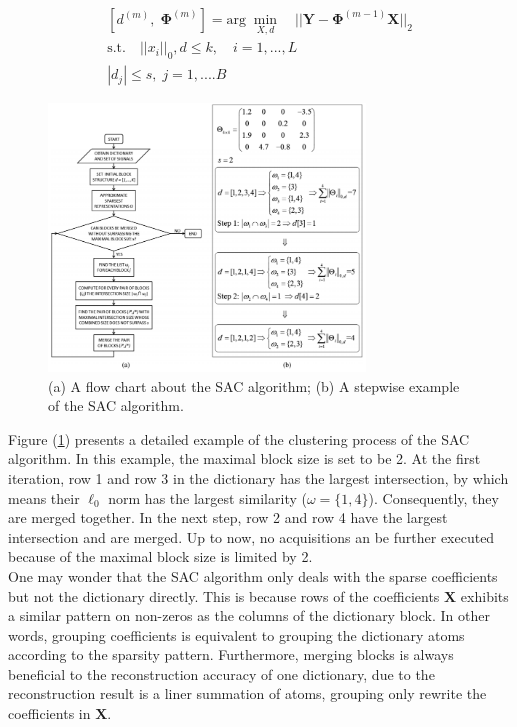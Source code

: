 \begin{equation}
\begin{aligned}
    \left[d^{(m)}, \;\mathbf{\Phi}^{(m)}\right] = \text{arg} \; \min_{X,d} \quad || \mathbf{Y} - \mathbf{\Phi}^{(m-1)}\mathbf{X}||_2 \\
    \text{s.t.} \quad ||x_i||_0,d \leq k, \quad i = 1,...,L\\
    |d_j| \leq s, \; j = 1,....B
\end{aligned}
\end{equation}

\begin{figure}[!htbp]
\centering
\includegraphics[width=0.75\textwidth]{images/flow_chart.png}
\caption{(a) A flow chart about the SAC algorithm; (b) A stepwise example of the SAC algorithm.}
\label{flow_sac}
\end{figure}

Figure (\ref{flow_sac}) presents a detailed example of the clustering process of the SAC algorithm. In this example, the maximal block size is set to be 2. At the first iteration, row 1 and row 3 in the dictionary has the largest intersection, by which means their $\ell_0$ norm has the largest similarity ($\omega = \{1,4\}$). Consequently, they are merged together. In the next step, row 2 and row 4 have the largest intersection and are merged. Up to now, no acquisitions an be further executed because of the maximal block size is limited by 2. \\

One may wonder that the SAC algorithm only deals with the sparse coefficients but not the dictionary directly. This is because rows of the coefficients $\mathbf{X}$ exhibits a similar pattern on non-zeros as the columns of the dictionary block. In other words, grouping coefficients is equivalent to grouping the dictionary atoms according to the sparsity pattern. Furthermore, merging blocks is always beneficial to the reconstruction accuracy of one dictionary, due to the reconstruction result is a liner summation of atoms, grouping only rewrite the coefficients in $\mathbf{X}$.


